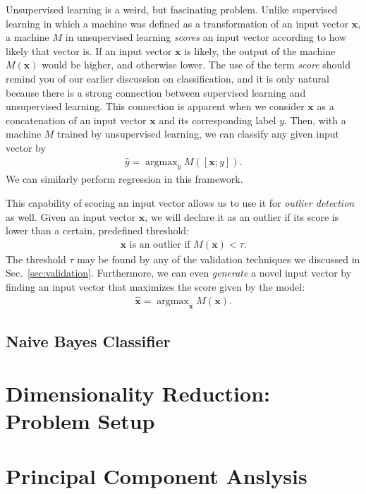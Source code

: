 \documentclass{report}
\newcommand{\vect}[1]{\mathbf{#1}}
\newcommand{\vx}[0]{\vect{x}}
\newcommand{\todo}[1]{{\Large\textcolor{red}{#1}}}
\DeclareMathOperator*{\argmax}{\arg \max}
\begin{document}
Unsupervised learning is a weird, but fascinating problem. Unlike supervised
learning in which a machine was defined as a transformation of an input vector
$\vx$, a machine $M$ in unsupervised learning {\it scores} an input vector
according to how likely that vector is. If an input vector $\vx$ is likely, the
output of the machine $M(\vx)$ would be higher, and otherwise lower. The use of
the term {\it score} should remind you of our earlier discussion on
classification, and it is only natural because there is a strong connection
between supervised learning and unsupervised learning. This connection is
apparent when we consider $\vx$ as a concatenation of an input vector $\vx$ and
its corresponding label $y$. Then, with a machine $M$ trained by unsupervised
learning, we can classify any given input vector by
\begin{align*}
    \hat{y} = \argmax_y M(\left[ \vx; y\right]).
\end{align*}
We can similarly perform regression in this framework.  

This capability of scoring an input vector allows us to use it for {\it outlier
detection} as well. Given an input vector $\vx$, we will declare it as an
outlier if its score is lower than a certain, predefined threshold:
\begin{align*}
    \vx\text{ is an outlier if }M(\vx) < \tau.
\end{align*}
The threshold $\tau$ may be found by any of the validation techniques we
discussed in Sec.~\ref{sec:validation}.  Furthermore, we can even {\it generate}
a novel input vector by finding an input vector that maximizes the score given
by the model:
\begin{align*}
    \hat{\vx} = \argmax_{\vx} M(\vx).
\end{align*}

\todo{}




\subsection{Naive Bayes Classifier}

\todo{}

\section{Dimensionality Reduction: Problem Setup}
\label{sec:dimred}

\section{Principal Component Anslysis}
\end{document}
